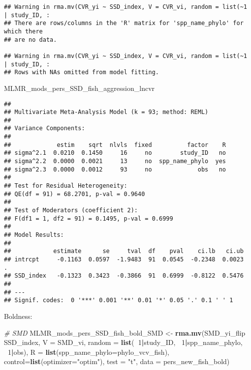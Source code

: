 \documentclass[]{article}
\newenvironment{Shaded}{\begin{snugshade}}{\end{snugshade}}
\newcommand{\KeywordTok}[1]{\textcolor[rgb]{0.13,0.29,0.53}{\textbf{#1}}}
\newcommand{\DataTypeTok}[1]{\textcolor[rgb]{0.13,0.29,0.53}{#1}}
\newcommand{\DecValTok}[1]{\textcolor[rgb]{0.00,0.00,0.81}{#1}}
\newcommand{\StringTok}[1]{\textcolor[rgb]{0.31,0.60,0.02}{#1}}
\newcommand{\CommentTok}[1]{\textcolor[rgb]{0.56,0.35,0.01}{\textit{#1}}}
\newcommand{\OperatorTok}[1]{\textcolor[rgb]{0.81,0.36,0.00}{\textbf{#1}}}
\newcommand{\NormalTok}[1]{#1}
\begin{document}
\begin{verbatim}
## Warning in rma.mv(CVR_yi ~ SSD_index, V = CVR_vi, random = list(~1 | study_ID, :
## There are rows/columns in the 'R' matrix for 'spp_name_phylo' for which there
## are no data.

## Warning in rma.mv(CVR_yi ~ SSD_index, V = CVR_vi, random = list(~1 | study_ID, :
## Rows with NAs omitted from model fitting.
\end{verbatim}

\begin{Shaded}
\begin{Highlighting}[]
\NormalTok{    MLMR_mods_pers_SSD_fish_aggression_lncvr}
\end{Highlighting}
\end{Shaded}

\begin{verbatim}
## 
## Multivariate Meta-Analysis Model (k = 93; method: REML)
## 
## Variance Components:
## 
##             estim    sqrt  nlvls  fixed          factor    R 
## sigma^2.1  0.0210  0.1450     16     no        study_ID   no 
## sigma^2.2  0.0000  0.0021     13     no  spp_name_phylo  yes 
## sigma^2.3  0.0000  0.0012     93     no             obs   no 
## 
## Test for Residual Heterogeneity:
## QE(df = 91) = 68.2701, p-val = 0.9640
## 
## Test of Moderators (coefficient 2):
## F(df1 = 1, df2 = 91) = 0.1495, p-val = 0.6999
## 
## Model Results:
## 
##            estimate      se     tval  df    pval    ci.lb   ci.ub 
## intrcpt     -0.1163  0.0597  -1.9483  91  0.0545  -0.2348  0.0023  . 
## SSD_index   -0.1323  0.3423  -0.3866  91  0.6999  -0.8122  0.5476    
## 
## ---
## Signif. codes:  0 '***' 0.001 '**' 0.01 '*' 0.05 '.' 0.1 ' ' 1
\end{verbatim}

Boldness:

\begin{Shaded}
\begin{Highlighting}[]
    \CommentTok{# SMD}
\NormalTok{      MLMR_mods_pers_SSD_fish_bold_SMD <-}\StringTok{ }\KeywordTok{rma.mv}\NormalTok{(SMD_yi_flip }\OperatorTok{~}\StringTok{ }\NormalTok{SSD_index, }\DataTypeTok{V =}\NormalTok{ SMD_vi, }
                                          \DataTypeTok{random =} \KeywordTok{list}\NormalTok{(}\OperatorTok{~}\DecValTok{1}\OperatorTok{|}\NormalTok{study_ID, }\OperatorTok{~}\DecValTok{1}\OperatorTok{|}\NormalTok{spp_name_phylo, }\OperatorTok{~}\DecValTok{1}\OperatorTok{|}\NormalTok{obs), }
                                          \DataTypeTok{R =} \KeywordTok{list}\NormalTok{(}\DataTypeTok{spp_name_phylo=}\NormalTok{phylo_vcv_fish), }\DataTypeTok{control=}\KeywordTok{list}\NormalTok{(}\DataTypeTok{optimizer=}\StringTok{"optim"}\NormalTok{), }
                                          \DataTypeTok{test =} \StringTok{"t"}\NormalTok{, }\DataTypeTok{data =}\NormalTok{ pers_new_fish_bold)}
\end{Highlighting}
\end{Shaded}
\end{document}
